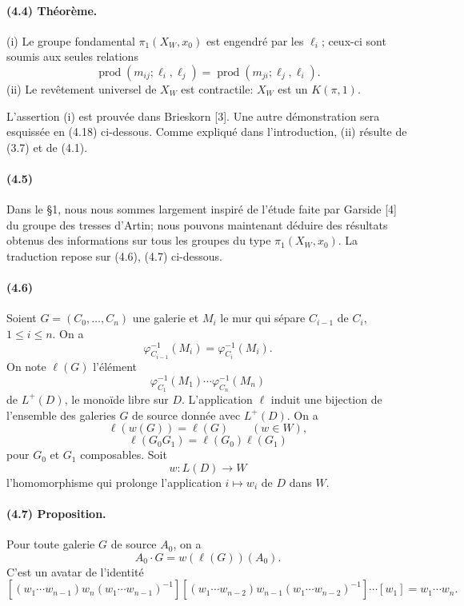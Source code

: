 \documentclass[10pt]{article}
\newcommand{\prodalt}{\operatorname{prod}}
\begin{document}
\paragraph{(4.4) Théorème.} (i) Le groupe fondamental \(\pi_1(X_W,x_0)\) est engendré par les \(\ell_i\); ceux-ci sont soumis aux seules relations
\[
\tag{4.4.1}
\prodalt(m_{ij};\ell_i,\ell_j)=\prodalt(m_{ji};\ell_j,\ell_i).
\]
(ii) Le revêtement universel de \(X_W\) est contractile: \(X_W\) est un \(K(\pi,1)\).

L'assertion (i) est prouvée dans Brieskorn [3]. Une autre démonstration sera esquissée en (4.18) ci-dessous. Comme expliqué dans l'introduction, (ii) résulte de (3.7) et de (4.1).

\paragraph{(4.5)} Dans le §1, nous nous sommes largement inspiré de l'étude faite par Garside [4] du groupe des tresses d'Artin; nous pouvons maintenant déduire des résultats obtenus des informations sur tous les groupes du type \(\pi_1(X_W,x_0)\). La traduction repose sur (4.6), (4.7) ci-dessous.

\paragraph{(4.6)} Soient \(G=(C_0,\ldots,C_n)\) une galerie et \(M_i\) le mur qui sépare \(C_{i-1}\) de \(C_i\), \(1\le i\le n\). On a
\[
\varphi^{-1}_{C_{i-1}}(M_i)=\varphi^{-1}_{C_i}(M_i).
\]
On note \(\ell(G)\) l'élément
\[
\varphi^{-1}_{C_1}(M_1)\cdots \varphi^{-1}_{C_n}(M_n)
\]
de \(L^+(D)\), le monoïde libre sur \(D\). L'application \(\ell\) induit une bijection de l'ensemble des galeries \(G\) de source donnée avec \(L^+(D)\). On a
\[
\tag{4.6.1}
\ell(w(G))=\ell(G)\qquad(w\in W),
\]
\[
\tag{4.6.2}
\ell(G_0G_1)=\ell(G_0)\ell(G_1)
\]
pour \(G_0\) et \(G_1\) composables. Soit
\[
w:L(D)\longrightarrow W
\]
l'homomorphisme qui prolonge l'application \(i\mapsto w_i\) de \(D\) dans \(W\).

\paragraph{(4.7) Proposition.} Pour toute galerie \(G\) de source \(A_0\), on a
\[
A_0\cdot G=w(\ell(G))(A_0).
\]
C'est un avatar de l'identité
\[
[(w_1\cdots w_{n-1})w_n(w_1\cdots w_{n-1})^{-1}]
[(w_1\cdots w_{n-2})w_{n-1}(w_1\cdots w_{n-2})^{-1}]
\cdots [w_1]=w_1\cdots w_n.
\]
\end{document}
